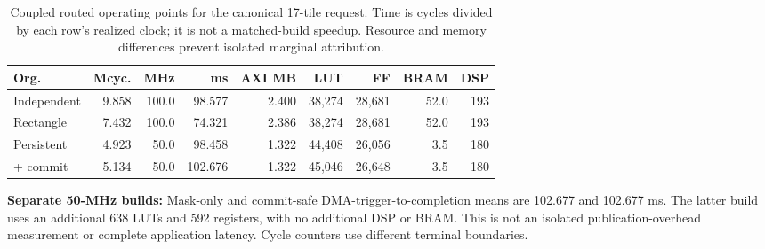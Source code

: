 \begin{table}[!htbp]
\centering
\caption{Coupled routed operating points for the canonical 17-tile request. Time is cycles divided by each row's realized clock; it is not a matched-build speedup. Resource and memory differences prevent isolated marginal attribution.}
\label{tab:organization-operating-points}
\small
\setlength{\tabcolsep}{2.6pt}
\begin{tabular}{lrrrrrrrr}
\toprule
Org. & Mcyc. & MHz & ms & AXI MB & LUT & FF & BRAM & DSP \\ \midrule
Independent & 9.858 & 100.0 & 98.577 & 2.400 & 38,274 & 28,681 & 52.0 & 193 \\
Rectangle & 7.432 & 100.0 & 74.321 & 2.386 & 38,274 & 28,681 & 52.0 & 193 \\
Persistent & 4.923 & 50.0 & 98.458 & 1.322 & 44,408 & 26,056 & 3.5 & 180 \\
+ commit & 5.134 & 50.0 & 102.676 & 1.322 & 45,046 & 26,648 & 3.5 & 180 \\
\bottomrule
\end{tabular}
\end{table}
\noindent\textbf{Separate 50-MHz builds:} Mask-only and commit-safe DMA-trigger-to-completion means are 102.677 and 102.677 ms. The latter build uses an additional 638 LUTs and 592 registers, with no additional DSP or BRAM. This is not an isolated publication-overhead measurement or complete application latency. Cycle counters use different terminal boundaries.
